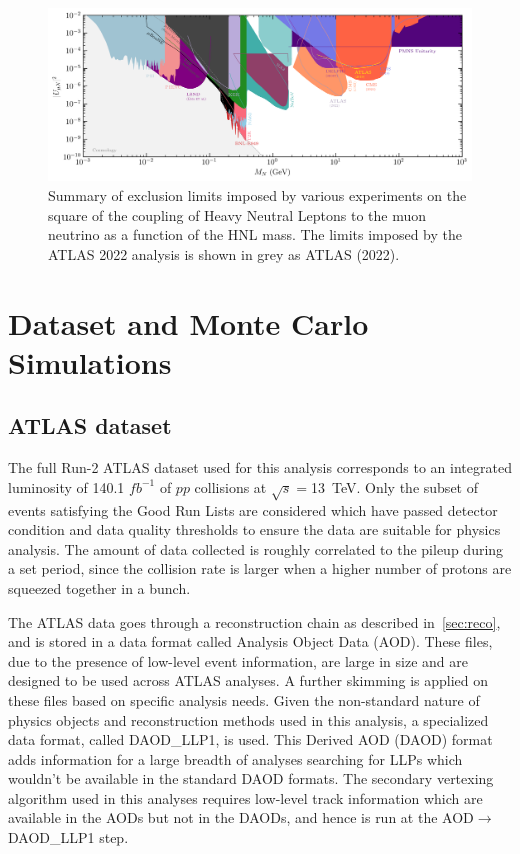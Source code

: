 \begin{figure}[!ht]
    \centering
    \includegraphics[width=1\linewidth]{figures/analysis_overview/HNL_summary_mu.png}
    \caption{Summary of exclusion limits imposed by various experiments on the square of the coupling of Heavy Neutral Leptons to the muon neutrino as a function of the HNL mass. The limits imposed by the ATLAS 2022 analysis is shown in grey as ATLAS (2022).~\cite{Fernandez-Martinez:2023phj}}
    \label{fig:HNL-summ-mu}
\end{figure}

\section{Dataset and Monte Carlo Simulations}\label{sec:data_mc_samples}
\subsection{ATLAS dataset}
The full Run-2 ATLAS dataset used for this analysis corresponds to an integrated luminosity of 140.1 $fb^{-1}$ of $pp$ collisions at $\sqrt{s}=$13~TeV. Only the subset of events satisfying the Good Run Lists are considered which have passed detector condition and data quality thresholds to ensure the data are suitable for physics analysis. The amount of data collected is roughly correlated to the pileup during a set period, since the collision rate is larger when a higher number of protons are squeezed together in a bunch.

The ATLAS data goes through a reconstruction chain as described in~\cref{sec:reco}, and is stored in a data format called Analysis Object Data (AOD). These files, due to the presence of low-level event information, are large in size and are designed to be used across ATLAS analyses. A further skimming is applied on these files based on specific analysis needs.
Given the non-standard nature of physics objects and reconstruction methods used in this analysis, a specialized data format, called DAOD\_LLP1, is used. This Derived AOD (DAOD) format adds information for a large breadth of analyses searching for LLPs which wouldn't be available in the standard DAOD formats. The secondary vertexing algorithm used in this analyses requires low-level track information which are available in the AODs but not in the DAODs, and hence is run at the AOD$\rightarrow$DAOD\_LLP1 step. 

